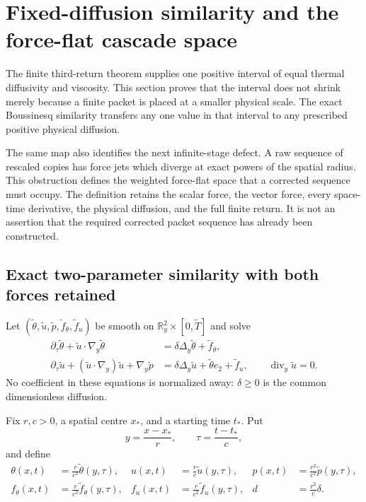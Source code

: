 \section{Fixed-diffusion similarity and the force-flat cascade space}
\label{im:section}

The finite third-return theorem supplies one positive interval of equal
thermal diffusivity and viscosity.  This section proves that the interval
does not shrink merely because a finite packet is placed at a smaller
physical scale.  The exact Boussinesq similarity transfers any one value
in that interval to any prescribed positive physical diffusion.

The same map also identifies the next infinite-stage defect.  A raw
sequence of rescaled copies has force jets which diverge at exact powers
of the spatial radius.  This obstruction defines the weighted
force-flat space that a corrected sequence must occupy.  The definition
retains the scalar force, the vector force, every space-time derivative,
the physical diffusion, and the full finite return.  It is not an
assertion that the required corrected packet sequence has already been
constructed.

\subsection{Exact two-parameter similarity with both forces retained}

Let $(\widetilde\theta,\widetilde u,\widetilde p,
\widetilde f_\theta,\widetilde f_u)$ be smooth on
$\mathbb R^2_y\times[0,\widetilde T]$ and solve
\begin{align}
 \partial_\tau\widetilde\theta+
 \widetilde u\cdot\nabla_y\widetilde\theta
 &=\delta\Delta_y\widetilde\theta+\widetilde f_\theta,
 \label{im:normalized-scalar}\\
 \partial_\tau\widetilde u+
 (\widetilde u\cdot\nabla_y)\widetilde u+\nabla_y\widetilde p
 &=\delta\Delta_y\widetilde u+\widetilde\theta e_2+
   \widetilde f_u,\qquad
 \operatorname{div}_y\widetilde u=0 .
 \label{im:normalized-vector}
\end{align}
No coefficient in these equations is normalized away: $\delta\geq0$
is the common dimensionless diffusion.

Fix $r,c>0$, a spatial centre $x_*$, and a starting time $t_*$.  Put
\begin{equation}\label{im:variables}
 y=\frac{x-x_*}{r},\qquad
 \tau=\frac{t-t_*}{c},
\end{equation}
and define
\begin{align}
 \theta(x,t)&=\frac{r}{c^2}\widetilde\theta(y,\tau),&
 u(x,t)&=\frac{r}{c}\widetilde u(y,\tau),&
 p(x,t)&=\frac{r^2}{c^2}\widetilde p(y,\tau),
 \label{im:field-map}\\
 f_\theta(x,t)&=\frac{r}{c^3}\widetilde f_\theta(y,\tau),&
 f_u(x,t)&=\frac{r}{c^2}\widetilde f_u(y,\tau),&
 d&=\frac{r^2}{c}\delta .
 \label{im:force-map}
\end{align}

